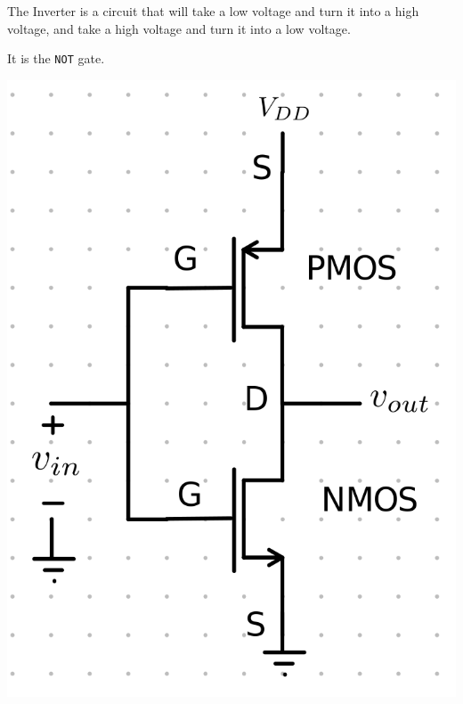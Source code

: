 \documentclass[12pt,letterpaper]{article} \usepackage{amsmath} \usepackage{graphicx} \usepackage[margin=1in]{geometry} \usepackage{longtable}  \usepackage{amssymb}
\begin{document}
	The Inverter is a circuit that will take a low voltage and turn it into a high voltage, and take a high voltage and turn it into a low voltage. 
	
	It is the \verb|NOT| gate.
	\begin{center}
		\includegraphics[width=0.34\linewidth]{cmos}
	\end{center}
	
	
\end{document}
